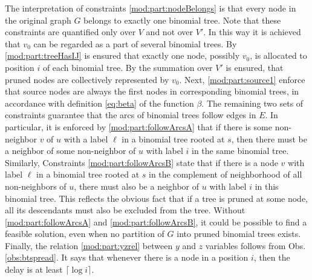The interpretation of constraints \eqref{mod:part:nodeBelongs} is that every node in the original graph $G$ belongs to exactly one binomial tree.
Note that these constraints are quantified only over $V$ and not over $V'$.
In this way it is achieved that $v_0$ can be regarded as a part of several binomial trees.
By \eqref{mod:part:treeHasIJ} is ensured that exactly one node, possibly $v_0$, is allocated to position $i$ of each binomial tree.
By the summation over $V'$ is ensured, that pruned nodes are collectively represented by $v_0$.
Next, \eqref{mod:part:source1} enforce that source nodes are always the first nodes in corresponding binomial trees, in accordance with definition \eqref{eq:beta} of the function $\beta$.
The remaining two sets of constraints guarantee that the arcs of binomial trees follow edges in $E$.
In particular, it is enforced by \eqref{mod:part:followArcsA} that if there is some  non-neighbor $v$ of $u$  with a label $\ell$ in a binomial tree rooted at $s$,
then there must be a neighbor of some non-neighbor of $u$ with label $i$ in the same binomial tree.
Similarly, Constraints \eqref{mod:part:followArcsB} state that if there is a node $v$ with label $\ell$ in a binomial tree rooted at $s$ in the complement of neighborhood of all non-neighbors of $u$,
there must also be a neighbor of $u$ with label $i$ in this binomial tree. 
This reflects the obvious fact that if a tree is pruned at some node, all its descendants must also be excluded from the tree.
Without \eqref{mod:part:followArcsA} and \eqref{mod:part:followArcsB}, it could be possible to find a feasible solution, even when no partition of $G$ into pruned binomial trees exists.
Finally, the relation \eqref{mod:part:yzrel} between $y$ and $z$ variables follows from Obs. \ref{obs:btspread}. 
It says that whenever there is a node in a position $i$, then the delay is at least $\lceil\log i\rceil$.
%
